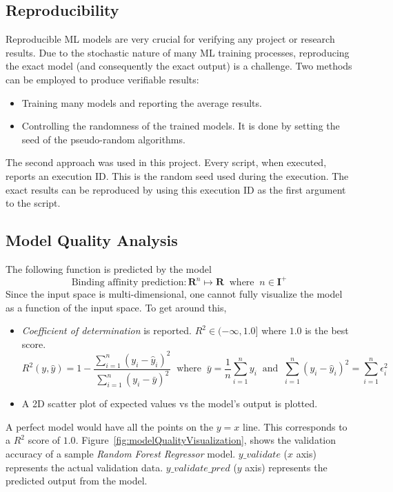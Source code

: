 \documentclass[11pt]{article}
\begin{document}
\subsection{Reproducibility}
Reproducible ML models are very crucial for verifying any project or research results. Due to the stochastic nature of many ML training processes, reproducing the exact model (and consequently the exact output) is a challenge. Two methods can be employed to produce verifiable results:
\begin{itemize}
\item Training many models and reporting the average results.
\item Controlling the randomness of the trained models. It is done by setting the seed of the pseudo-random algorithms.
\end{itemize}

The second approach was used in this project. Every script, when executed, reports an execution ID. This is the random seed used during the execution.  The exact results can be reproduced by using this execution ID as the first argument to the script.

\subsection{Model Quality Analysis}
The following function is predicted by the model
$$ \textrm{Binding affinity prediction} : \mathbf{R}^n \mapsto \mathbf{R} \;\; \textrm{where} \;\; n \in \mathbf{I}^+$$
Since the input space is multi-dimensional,  one cannot fully visualize the model as a function of the input space.
To get around this,
\begin{itemize}
\item \textit{Coefficient of determination} is reported. $R^2  \in (- \infty, 1.0]$ where $1.0$ is the best score. \cite{r_squared_score}
$$R^2(y, \hat{y}) = 1 - \frac{\sum_{i=1}^{n} (y_i - \hat{y}_i)^2}{\sum_{i=1}^{n} (y_i - \bar{y})^2} \;\; \textrm{where} \;\; \bar{y} = \frac{1}{n} \sum_{i=1}^{n} y_i \;\;
\textrm{and} \;\; \sum_{i=1}^{n} (y_i - \hat{y}_i)^2 = \sum_{i=1}^{n} \epsilon_i^2$$

\item A 2D scatter plot of expected values vs the model's output is plotted. 
\end{itemize}

A perfect model would have all the points on the $y = x$ line.  This corresponds to a $R^2$ score of $1.0$. 
Figure~\ref{fig:modelQualityVisualization},  shows the validation accuracy of a sample \textit{Random Forest Regressor} model.
$y\_validate$ ($x$ axis) represents the actual validation data.
$y\_validate\_pred$ ($y$ axis) represents the predicted output from the model.
\end{document}
